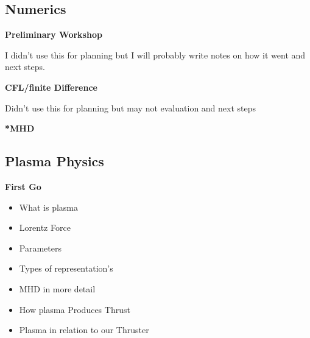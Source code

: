 \subsection{Numerics}

\textbf{Preliminary Workshop}

I didn't use this for planning but I will probably write notes on how it went and next steps.

\textbf{CFL/finite Difference}

Didn't use this for planning but may not evaluation and next steps

\textbf{*MHD}


\subsection{Plasma Physics}


\textbf{First Go}

\begin{itemize}
	\item What is plasma
	\item Lorentz Force
	\item Parameters
	\item Types of representation's
	\item MHD in more detail
	\item How plasma Produces Thrust
	\item Plasma in relation to our Thruster
\end{itemize}
